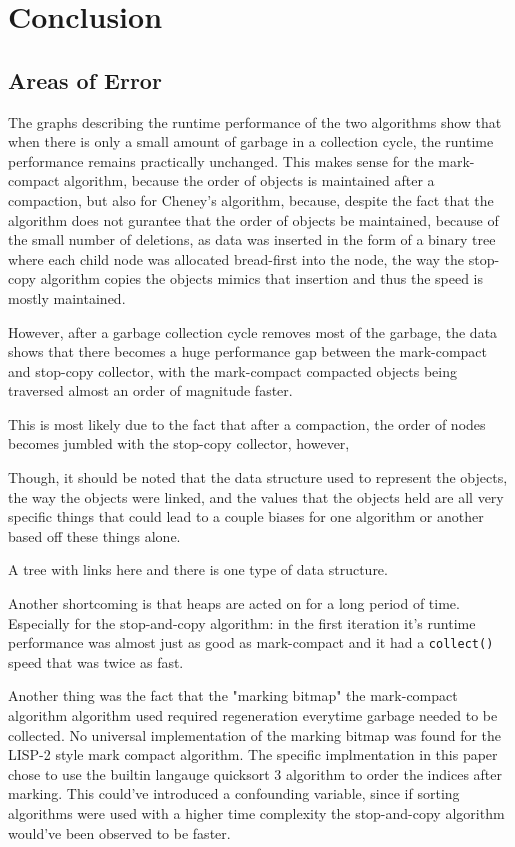 \documentclass[index]{subfiles}
\begin{document}
\section{Conclusion}
\subsection{Areas of Error}

The graphs describing the runtime performance of the two algorithms show that when there is only a small amount of garbage in a collection cycle, the runtime performance remains practically unchanged. This makes sense for the mark-compact algorithm, because the order of objects is maintained after a compaction, but also for Cheney's algorithm, because, despite the fact that the algorithm does not gurantee that the order of objects be maintained, because of the small number of deletions, as data was inserted in the form of a binary tree where each child node was allocated bread-first into the node, the way the stop-copy algorithm copies the objects mimics that insertion and thus the speed is mostly maintained.

However, after a garbage collection cycle removes most of the garbage, the data shows that there becomes a huge performance gap between the mark-compact and stop-copy collector, with the mark-compact compacted objects being traversed almost an order of magnitude faster.

This is most likely due to the fact that after a compaction, the order of nodes becomes jumbled with the stop-copy collector, however,

Though, it should be noted that the data structure used to represent the objects, the way the objects were linked, and the values that the objects held are all very specific things that could lead to a couple biases for one algorithm or another based off these things alone.

A tree with links here and there is one type of data structure.

Another shortcoming is that heaps are acted on for a long period of time. Especially for the stop-and-copy algorithm: in the first iteration it's runtime performance was almost just as good as mark-compact and it had a \verb+collect()+ speed that was twice as fast.

Another thing was the fact that the "marking bitmap" the mark-compact algorithm algorithm used required regeneration everytime garbage needed to be collected. No universal implementation of the marking bitmap was found for the LISP-2 style mark compact algorithm. The specific implmentation in this paper chose to use the builtin langauge quicksort 3 algorithm to order the indices after marking. This could've introduced a confounding variable, since if sorting algorithms were used with a higher time complexity the stop-and-copy algorithm would've been observed to be faster.
\end{document}
